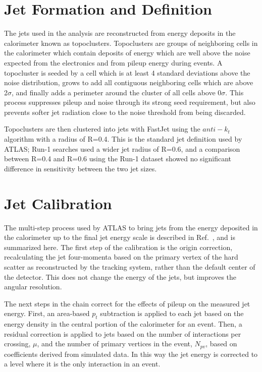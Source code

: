 \section{Jet Formation and Definition}

The jets used in the analysis are reconstructed from energy deposits in the calorimeter known as topoclusters.\cite{Topoclustering}  Topoclusters are groups of neighboring cells in the calorimeter which contain deposits of energy which are well above the noise expected from the electronics and from pileup energy during events.  A topocluster is seeded by a cell which is at least 4 standard deviations above the noise distribution, grows to add all contiguous neighboring cells which are above 2$\sigma$, and finally adds a perimeter around the cluster of all cells above 0$\sigma$.  This process suppresses pileup and noise through its strong seed requirement, but also prevents softer jet radiation close to the noise threshold from being discarded.  

Topoclusters are then clustered into jets with FastJet using the $anti-k_t$ algorithm with a radius of R=0.4.  This is the standard jet definition used by ATLAS; Run-1 searches used a wider jet radius of R=0.6, and a comparison between R=0.4 and R=0.6 using the Run-1 dataset showed no significant difference in sensitivity between the two jet sizes.

\section{Jet Calibration}

The multi-step process used by ATLAS to bring jets from the energy deposited in the calorimeter up to the final jet energy scale is described in Ref.~\cite{JES}, and is summarized here.  The first step of the calibration is the origin correction, recalculating the jet four-momenta based on the primary vertex of the hard scatter as reconstructed by the tracking system, rather than the default center of the detector.  This does not change the energy of the jets, but improves the angular resolution.

The next steps in the chain correct for the effects of pileup on the measured jet energy.  First, an area-based $p_t$ subtraction is applied to each jet based on the energy density in the central portion of the calorimeter for an event.  Then, a residual correction is applied to jets based on the number of interactions per crossing, $\mu$, and the number of primary vertices in the event, $N_{pv}$, based on coefficients derived from simulated data.  In this way the jet energy is corrected to a level where it is the only interaction in an event.

